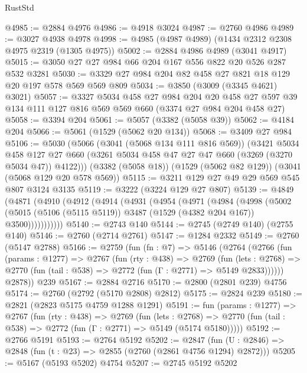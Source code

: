 \begin{lexlean}{RustStd}
\begin{coremodule}
@4985 := @2884 @4976
@4986 := @4918 @3024
@4987 := @2760 @4986
@4989 := @3027 @4938 @4978
@4998 := @4985 (@4987 @4989) (@1434 @2312 @2308 @4975 @2319 (@1305 @4975))
@5002 := @2884 @4986 @4989 (@3041 @4917)
@5015 := @3050 @27 @27 @984 @66 @204 @167 @556 @822 @20 @526 @287 @532 @3281
@5030 := @3329 @27 @984 @204 @82 @458 @27 @821 @18 @129 @20 @197 @578 @569 @569 @809
@5034 := @3850 (@3009 (@3345 @4621) @3021)
@5057 := @3327
    @5034
    @458
    @27
    @984
    @204
    @20
    @458
    @27
    @597
    @39
    @134
    @111
    @127
    @816
    @569
    @569
    @660
    (@3374 @27 @984 @204 @458 @27)
@5058 := @3394 @204
@5061 := @5057 (@3382 (@5058 @39))
@5062 := @4184 @204
@5066 := @5061 (@1529 (@5062 @20 @134))
@5068 := @3409 @27 @984
@5106 := @5030
    (@5066
      (@3041 (@5068 @134 @111 @816 @569))
      (@3421
        @5034
        @458
        @127
        @27
        @660
        (@3261 @5034 @458 @47 @27 @47 @660 (@3269 (@3270 @5034 @47)) @4122)))
    (@3382 (@5058 @18))
    (@1529 (@5062 @82 @129))
    (@3041 (@5068 @129 @20 @578 @569))
@5115 := @3211 @129 @27 @49 @29 @569 @545 @807 @3124 @3135
@5119 := @3222 (@3224 @129 @27 @807)
@5139 := @4849
    (@4871
      (@4910
        (@4912
          (@4914
            (@4931
              (@4954
                (@4971
                  (@4984
                    (@4998
                      (@5002
                        (@5015
                          (@5106 (@5115 @5119))
                          @3487
                          (@1529 (@4382 @204 @167))
                          @3500)))))))))))
@5140 := @2743 @140
@5144 := @2745 (@2749 @140) (@2755 @140)
@5146 := @2760 (@2714 @2761)
@5147 := @1284 @2332
@5149 := @2760 (@5147 @2788)
@5166 := @2759
    (fun (fn : @7) =>
    @5146
      (@2764
        (@2766
          (fun (params : @1277) =>
          @2767
            (fun (rty : @438) =>
            @2769
              (fun (lets : @2768) =>
              @2770 (fun (tail : @538) => @2772 (fun (Γ : @2771) => @5149 @2833))))))
        @2878))
    @239
@5167 := @2884 @2716
@5170 := @2800 (@2801 @239) @4756
@5174 := @2760 (@2792 (@5170 @2808) @2812)
@5175 := @2824 @239
@5180 := @2821 (@2823 @5175 @4759 @1288 @1291)
@5191 := fun (params : @1277) =>
  @2767
    (fun (rty : @438) =>
    @2769
      (fun (lets : @2768) =>
      @2770 (fun (tail : @538) => @2772 (fun (Γ : @2771) => @5149 (@5174 @5180)))))
@5192 := @2766 @5191
@5193 := @2764 @5192
@5202 := @2847 (fun (U : @2846) => @2848 (fun (t : @23) => @2855 (@2760 (@2861 @4756 @1294) @2872)))
@5205 := @5167 (@5193 @5202) @4754
@5207 := @2745 @5192 @5202

\end{coremodule}
\end{lexlean}
